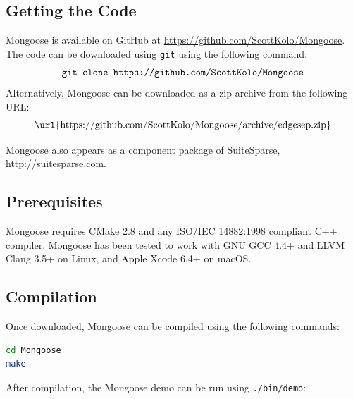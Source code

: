 \documentclass[letter]{article}
\begin{document}
\subsection{Getting the Code}
Mongoose is available on GitHub at \url{https://github.com/ScottKolo/Mongoose}. The code can be downloaded using \texttt{git} using the following command:
\[\text{\texttt{git clone https://github.com/ScottKolo/Mongoose}}\]
Alternatively, Mongoose can be downloaded as a zip archive from the following URL:
\[\text{\url{https://github.com/ScottKolo/Mongoose/archive/edgesep.zip}}\] 

Mongoose also appears as a component package of SuiteSparse, \url{http://suitesparse.com}.

\subsection{Prerequisites}
Mongoose requires CMake 2.8 and any ISO/IEC 14882:1998 compliant C++ compiler. Mongoose has been tested to work with GNU GCC 4.4+ and LLVM Clang 3.5+ on Linux, and Apple Xcode 6.4+ on macOS.

\subsection{Compilation}
Once downloaded, Mongoose can be compiled using the following commands:\\

\begin{lstlisting}[language=bash,numbers=none,xleftmargin=.2\textwidth, xrightmargin=.2\textwidth]
cd Mongoose
make
\end{lstlisting}


After compilation, the Mongoose demo can be run using \texttt{./bin/demo}:\\
\end{document}

